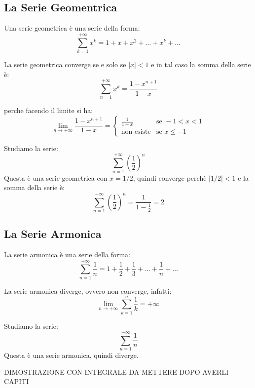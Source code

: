 \subsection{La Serie Geomentrica}
        \begin{definizione}
            Una serie geometrica è una serie della forma:
             \begin{equation}
                \sum_{k=1}^{+\infty} x^k = 1 + x + x^2 + \ldots + x^{k} + \ldots 
            \end{equation}
        \end{definizione}


    La serie geometrica converge se e solo se $|x| < 1$ e in tal caso la somma della serie è:
    \[ \sum_{n=1}^{+\infty} x^k = \frac{1-x^{n+1}}{1-x} \]

    perche facendo il limite si ha:
    \begin{equation}
                \lim_{n \to +\infty} \frac {1-x^{n+1}} {1-x} = \begin{cases}
                    \frac{1}{1-x} & \text{se } -1 < x < 1 \\
                    \text{non esiste} & \text{se } x \leq -1
                \end{cases}
    \end{equation}
    \begin{esempio}
        Studiamo la serie:
            \[ \sum_{n=1}^{+\infty} \left( \frac{1}{2} \right)^n \]
        Questa è una serie geometrica con $x = 1/2$, quindi converge perchè $|1/2| < 1$ e la somma della serie è:
        \[ \sum_{n=1}^{+\infty} \left( \frac{1}{2} \right)^n = \frac{1}{1-\frac{1}{2}} = 2 \]
    \end{esempio}

\subsection{La Serie Armonica}
        \begin{definizione}
            La serie armonica è una serie della forma:
            \[ \sum_{n=1}^{+\infty} \frac{1}{n} = 1 + \frac{1}{2} + \frac{1}{3} + \ldots + \frac{1}{n} + \ldots \]
        \end{definizione}
        La serie armonica diverge, ovvero non converge, infatti:
        \[ \lim_{n \to +\infty} \sum_{k=1}^{n} \frac{1}{k} = +\infty \]
        \begin{esempio}
            Studiamo la serie:
                \[ \sum_{n=1}^{+\infty} \frac{1}{n} \]
            Questa è una serie armonica, quindi diverge.
        \end{esempio} DIMOSTRAZIONE CON INTEGRALE DA METTERE DOPO AVERLI CAPITI
\newpage
